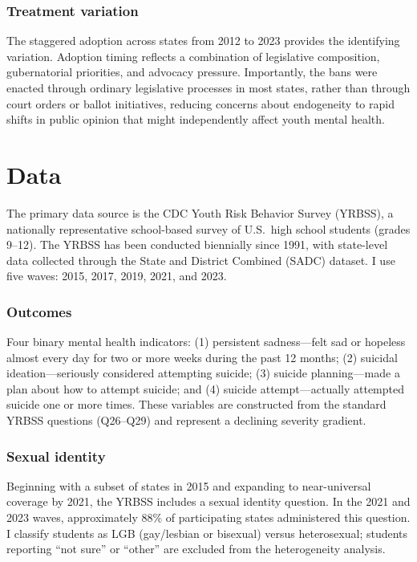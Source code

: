\documentclass[12pt]{article}
\begin{document}
\subsubsection*{Treatment variation} The staggered adoption across states from 2012 to 2023 provides the identifying variation. Adoption timing reflects a combination of legislative composition, gubernatorial priorities, and advocacy pressure. Importantly, the bans were enacted through ordinary legislative processes in most states, rather than through court orders or ballot initiatives, reducing concerns about endogeneity to rapid shifts in public opinion that might independently affect youth mental health.

\section{Data}

The primary data source is the CDC Youth Risk Behavior Survey (YRBSS), a nationally representative school-based survey of U.S.\ high school students (grades 9--12). The YRBSS has been conducted biennially since 1991, with state-level data collected through the State and District Combined (SADC) dataset. I use five waves: 2015, 2017, 2019, 2021, and 2023.

\subsubsection*{Outcomes} Four binary mental health indicators: (1) persistent sadness---felt sad or hopeless almost every day for two or more weeks during the past 12 months; (2) suicidal ideation---seriously considered attempting suicide; (3) suicide planning---made a plan about how to attempt suicide; and (4) suicide attempt---actually attempted suicide one or more times. These variables are constructed from the standard YRBSS questions (Q26--Q29) and represent a declining severity gradient.

\subsubsection*{Sexual identity} Beginning with a subset of states in 2015 and expanding to near-universal coverage by 2021, the YRBSS includes a sexual identity question. In the 2021 and 2023 waves, approximately 88\% of participating states administered this question. I classify students as LGB (gay/lesbian or bisexual) versus heterosexual; students reporting ``not sure'' or ``other'' are excluded from the heterogeneity analysis.
\end{document}
